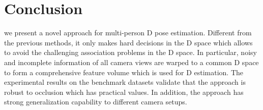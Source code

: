 \documentclass[runningheads]{llncs}
\begin{document}
\section{Conclusion}
we present a novel approach for multi-person D pose estimation. Different from the previous methods, it only makes hard decisions in the D space which allows to avoid the challenging association problems in the D space. In particular, noisy and incomplete information of all camera views are warped to a common D space to form a comprehensive feature volume which is used for D estimation. The experimental results on the benchmark datasets validate that the approach is robust to occlusion which has practical values. In addition, the approach has strong generalization capability to different camera setups.



\clearpage



\end{document}
